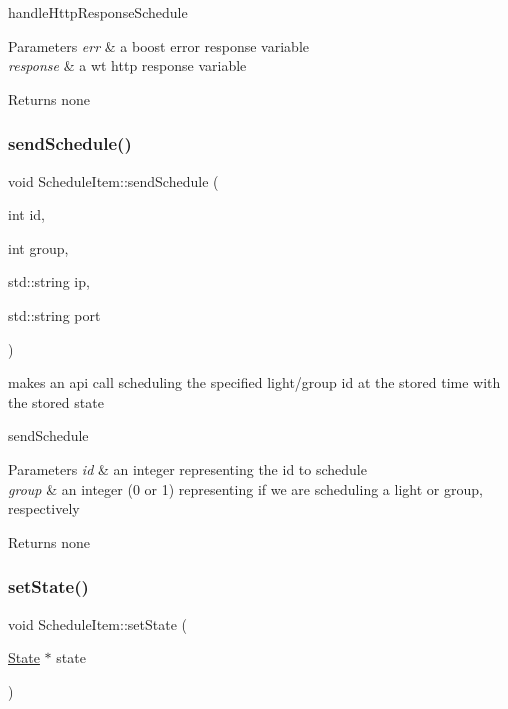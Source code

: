handle\+Http\+Response\+Schedule 
\begin{DoxyParams}{Parameters}
{\em err} & a boost error response variable \\
\hline
{\em response} & a wt http response variable \\
\hline
\end{DoxyParams}
\begin{DoxyReturn}{Returns}
none 
\end{DoxyReturn}
\mbox{\label{class_schedule_item_ae7a664bd9f94a5a8dcd4394c0c2d046a}} 
\subsubsection{\texorpdfstring{send\+Schedule()}{sendSchedule()}}
{\footnotesize\ttfamily void Schedule\+Item\+::send\+Schedule (\begin{DoxyParamCaption}\item[{int}]{id,  }\item[{int}]{group,  }\item[{std\+::string}]{ip,  }\item[{std\+::string}]{port }\end{DoxyParamCaption})}



makes an api call scheduling the specified light/group id at the stored time with the stored state 

send\+Schedule 
\begin{DoxyParams}{Parameters}
{\em id} & an integer representing the id to schedule \\
\hline
{\em group} & an integer (0 or 1) representing if we are scheduling a light or group, respectively \\
\hline
\end{DoxyParams}
\begin{DoxyReturn}{Returns}
none 
\end{DoxyReturn}
\mbox{\label{class_schedule_item_a3582a8819347ee2e0a5ee550e718cb51}} 
\subsubsection{\texorpdfstring{set\+State()}{setState()}}
{\footnotesize\ttfamily void Schedule\+Item\+::set\+State (\begin{DoxyParamCaption}\item[{\hyperlink{class_state}{State} $\ast$}]{state }\end{DoxyParamCaption})}



